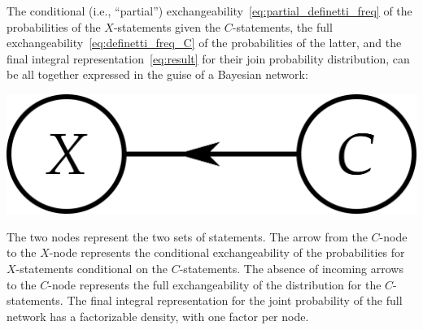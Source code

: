 \documentclass[\ifafour a4paper,12pt,\else a5paper,10pt,\fi%
onecolumn,oneside,article,%
british%
]{memoir}
\theoremstyle{remark}
\theoremstyle{innote}
\renewcommand*{\|}[1][]{\nonscript\,#1\vert\nonscript\,\mathopen{}}
\newcommand*{\ie}{{i.e.}}
\renewcommand*{\=}{\TextOrMath\texteq\eq}
\begin{document}
The conditional (\ie, \enquote{partial})
exchangeability~\eqref{eq:partial_definetti_freq} of the probabilities of
the $X$-statements given the $C$-statements, the full
exchangeability~\eqref{eq:definetti_freq_C} of the probabilities of the
latter, and the final integral representation~\eqref{eq:result} for their
join probability distribution, can be all together expressed in the guise
of a Bayesian network:
\begin{center}%
\includegraphics[scale=0.5]{bayesnet1.png}
\figcaption{\label{fig:simplenet}}  
\end{center}%
The two nodes represent the two sets of statements. The arrow from the
$C$-node to the $X$-node represents the conditional exchangeability of the
probabilities for $X$-statements conditional on the $C$-statements. The
absence of incoming arrows to the $C$-node represents the full
exchangeability of the distribution for the $C$-statements. The final
integral representation for the joint probability of the full network has a
factorizable density, with one factor per node.
\end{document}
